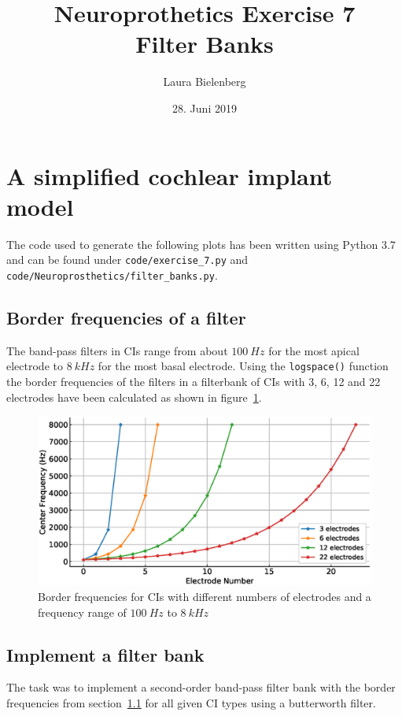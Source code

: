 \documentclass{scrartcl}			%
\title{Neuroprothetics Exercise 7\\Filter Banks}
\author{ Laura Bielenberg }
\date{28. Juni 2019}
\begin{document}

\maketitle

\section{A simplified cochlear implant model}
The code used to generate the following plots has been written using Python 3.7 and can be found under \texttt{code/exercise\_7.py} and \texttt{code/Neuroprosthetics/filter\_banks.py}.

\subsection{Border frequencies of a filter}\label{sec:borderfreq}
The band-pass filters in CIs range from about $\SI{100}{Hz}$ for the most apical electrode to $\SI{8}{kHz}$ for the most basal electrode. Using the \texttt{logspace()} function the border frequencies of the filters in a filterbank of CIs with 3, 6, 12 and 22 electrodes have been calculated as shown in figure~\ref{fig:border_freq}.
\begin{figure}[H]
\centering
\includegraphics[width=0.9\linewidth]{imgs/center_frequencies_all.eps}
    \caption{Border frequencies for CIs with different numbers of electrodes and a frequency range of $\SI{100}{Hz}$ to $\SI{8}{kHz}$ } 
    \label{fig:border_freq} 
\end{figure}

\subsection{Implement a filter bank}
The task was to implement a second-order band-pass filter bank with the border frequencies from section~\ref{sec:borderfreq} for all given CI types using a butterworth filter. 
\end{document}
